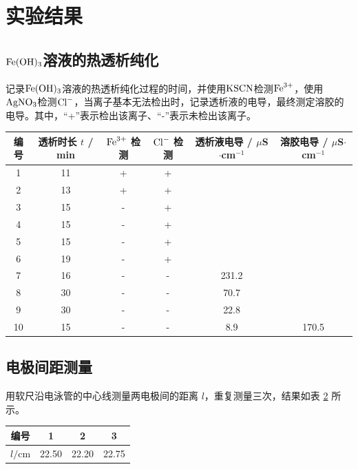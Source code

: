 \section{实验结果}

\subsection{\(\ce{Fe(OH)3}\)溶液的热透析纯化}

记录\(\ce{Fe(OH)3}\)溶液的热透析纯化过程的时间，并使用$\ce{KSCN}$检测$\ce{Fe^3+}$，使用$\ce{AgNO3}$检测$\ce{Cl-}$，当离子基本无法检出时，记录透析液的电导，最终测定溶胶的电导。其中，“+”表示检出该离子、“-”表示未检出该离子。

\begin{table}[htbp]
\centering
{}
\begin{tabular}{cccccc}
\toprule
编号 & 透析时长 $t$ / min & $\ce{Fe^3+}$ 检测 & $\ce{Cl-}$ 检测 & 透析液电导 / $\mu$S$\cdot$cm$^{-1}$ & 溶胶电导 / $\mu$S$\cdot$cm$^{-1}$ \\
\midrule
1 & 11 & + & + & & \\
2 & 13 & + & + & & \\
3 & 15 & - & + & & \\
4 & 15 & - & + & & \\
5 & 15 & - & + & & \\
6 & 19 & - & + & & \\
7 & 16 & - & - & 231.2 & \\
8 & 30 & - & - & 70.7 & \\
9 & 30 & - & - & 22.8 & \\
10 & 15 & - & - & 8.9 & 170.5 \\
\bottomrule
\end{tabular}
\label{tab:1}
\end{table}

\subsection{电极间距测量}

用软尺沿电泳管的中心线测量两电极间的距离 $l$，重复测量三次，结果如表 \ref{tab:3} 所示。
\begin{table}[htbp]
\centering
{}
\begin{tabular}{cccc}
\toprule
编号 &  1 & 2 & 3 \\
\midrule
$l / \mathrm{cm}$ & 22.50 & 22.20 & 22.75 \\
\bottomrule
\end{tabular}
\label{tab:3}
\end{table}

